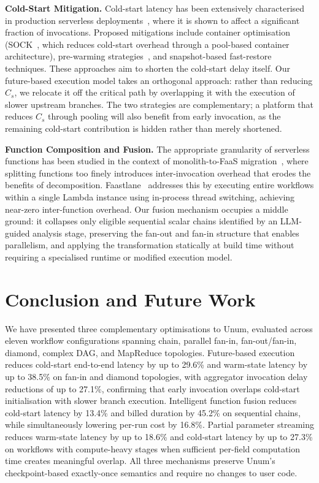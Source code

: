 \documentclass[runningheads]{llncs}
\begin{document}
\textbf{Cold-Start Mitigation.}
Cold-start latency has been extensively characterised in production serverless deployments~\cite{shahrad2020serverless}, where it is shown to affect a significant fraction of invocations. Proposed mitigations include container optimisation (SOCK~\cite{oakes2018sock}, which reduces cold-start overhead through a pool-based container architecture), pre-warming strategies~\cite{lin2019mitigatingcoldstartsserverless}, and snapshot-based fast-restore techniques. These approaches aim to shorten the cold-start delay itself. Our future-based execution model takes an orthogonal approach: rather than reducing $C_s$, we relocate it off the critical path by overlapping it with the execution of slower upstream branches. The two strategies are complementary; a platform that reduces $C_s$ through pooling will also benefit from early invocation, as the remaining cold-start contribution is hidden rather than merely shortened.

\textbf{Function Composition and Fusion.}
The appropriate granularity of serverless functions has been studied in the context of monolith-to-FaaS migration~\cite{wurz2020migrating}, where splitting functions too finely introduces inter-invocation overhead that erodes the benefits of decomposition. Faastlane~\cite{kotni2021faastlane} addresses this by executing entire workflows within a single Lambda instance using in-process thread switching, achieving near-zero inter-function overhead. Our fusion mechanism occupies a middle ground: it collapses only eligible sequential scalar chains identified by an LLM-guided analysis stage, preserving the fan-out and fan-in structure that enables parallelism, and applying the transformation statically at build time without requiring a specialised runtime or modified execution model.

\section{Conclusion and Future Work}
\label{sec:conclusion}

We have presented three complementary optimisations to Unum, evaluated across eleven workflow configurations spanning chain, parallel fan-in, fan-out/fan-in, diamond, complex DAG, and MapReduce topologies. Future-based execution reduces cold-start end-to-end latency by up to 29.6\% and warm-state latency by up to 38.5\% on fan-in and diamond topologies, with aggregator invocation delay reductions of up to 27.1\%, confirming that early invocation overlaps cold-start initialisation with slower branch execution. Intelligent function fusion reduces cold-start latency by 13.4\% and billed duration by 45.2\% on sequential chains, while simultaneously lowering per-run cost by 16.8\%. Partial parameter streaming reduces warm-state latency by up to 18.6\% and cold-start latency by up to 27.3\% on workflows with compute-heavy stages when sufficient per-field computation time creates meaningful overlap. All three mechanisms preserve Unum's checkpoint-based exactly-once semantics and require no changes to user code.
\end{document}

